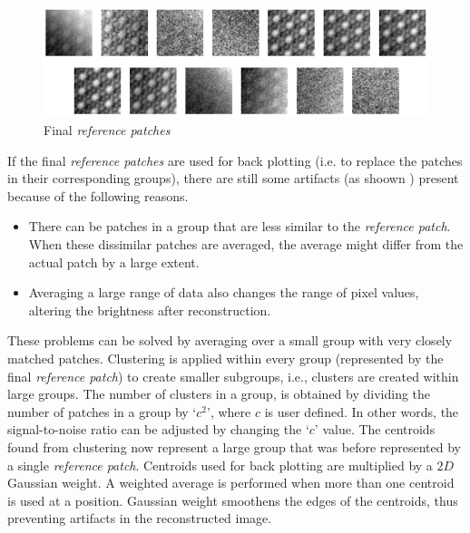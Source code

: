 \documentclass[fleqn,10pt]{wlscirep}
\begin{document}
\begin{figure}
	\centering
	\includegraphics[scale=0.8]{./imgs/final_reference_patches.png}
	\caption{Final \textit{reference patches}}
	\label{fig:final_reference_patches}
\end{figure} 

If the final \textit{reference patches} are used for back plotting (i.e. to replace the patches in their corresponding groups), there are still some artifacts (as shoown ) present because of the following reasons. 


\begin{itemize}
	\item There can be patches in a group that are less similar to the \textit{reference patch}. When these dissimilar patches are averaged, the average might differ from the actual patch by a large extent. 
	\item Averaging a large range of data also changes the range of pixel values,
	altering the brightness after reconstruction.
\end{itemize}

These problems can be solved by averaging over a small group with very closely matched patches. Clustering is applied within every group (represented by the final \textit{reference patch}) to create smaller subgroups, i.e., clusters are created within large groups. The number of clusters in a group, is obtained by dividing the number of patches in a group by `$c^2$’, where $c$ is user defined. In other words, the signal-to-noise ratio can be adjusted by changing the `$c$’ value. The centroids found from clustering now represent a large group that was before represented by a single \textit{reference patch}.  Centroids used for back plotting are multiplied by a $2D$ Gaussian weight. A weighted average is performed when more than one centroid is used at a position. Gaussian weight smoothens the edges of the centroids, thus preventing artifacts in the reconstructed image. 
\end{document}
